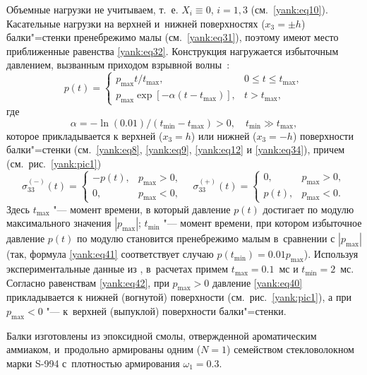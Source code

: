 Объемные нагрузки не учитываем, т.~е. $X_i \equiv 0$, $i=1, 3$ (см.~\eqref{yank:eq10}). 
Касательные нагрузки на верхней и~нижней поверхностях ($x_3 =\pm h$) балки"=стенки пренебрежимо малы (см.~\eqref{yank:eq31}), поэтому имеют место приближенные равенства \eqref{yank:eq32}. 
Конструкция нагружается избыточным давлением, вызванным приходом взрывной волны~\cite{yank:bib19}:
\begin{equation}
\label{yank:eq40}
p( t )=\begin{cases}
p_{\max } t/t_{\max}, & 0 \le t\le t_{\max}, \\
p_{\max } \exp [-\alpha (t-t_{\max}) ],& t>t_{\max},
\end{cases}
\end{equation}
где
\begin{equation}
\label{yank:eq41}
\alpha =-\ln (0.01)/(t_{\min} -t_{\max} )>0,\quad t_{\min} \gg t_{\max},
\end{equation}
которое прикладывается к верхней ($x_3 =h$) или нижней ($x_3 =-h$)
поверхности балки"=стенки (см.~\eqref{yank:eq8}, \eqref{yank:eq9}, \eqref{yank:eq12} и \eqref{yank:eq34}), причем (см.~рис.~\ref{yank:pic1})
\begin{equation}
\label{yank:eq42}
\sigma _{33}^{(-)} (t)=\begin{cases}
-p (t), & p_{\max} >0, \\
 0, & p_{\max} <0,
 \end{cases} \quad \sigma
_{33}^{(+)} (t)=\begin{cases}
 0, & p_{\max} >0, \\
 p(t),& p_{\max} <0.
\end{cases}
\end{equation}
Здесь $t_{\max}$ "--- момент времени, в который давление $p( t )$ достигает по модулю максимального значения 
$|p_{\max } |$; $t_{\min} $ "--- момент времени, при котором избыточное давление $p( t )$ по модулю становится пренебрежимо малым в~сравнении с $|p_{\max } |$ (так, формула \eqref{yank:eq41} соответствует
случаю $p (t_{\min} )=0.01p_{\max }$). 
Используя экспериментальные данные из \cite{yank:bib19,yank:bib21}, в~расчетах примем $t_{\max}=0.1$~мс и $t_{\min} =2$~мс. Согласно равенствам \eqref{yank:eq42}, при $p_{\max} >0$ давление \eqref{yank:eq40} прикладывается к нижней
(вогнутой) поверхности (см.~рис.~\ref{yank:pic1}), а при $p_{\max} <0$ "--- к~верхней (выпуклой) поверхности балки"=стенки.

Балки изготовлены из эпоксидной смолы, отвержденной ароматическим аммиаком, и~продольно армированы одним ($N=1$) семейством стекловолокном марки S-994 с~плотностью армирования $\omega _1 =0.3$.

